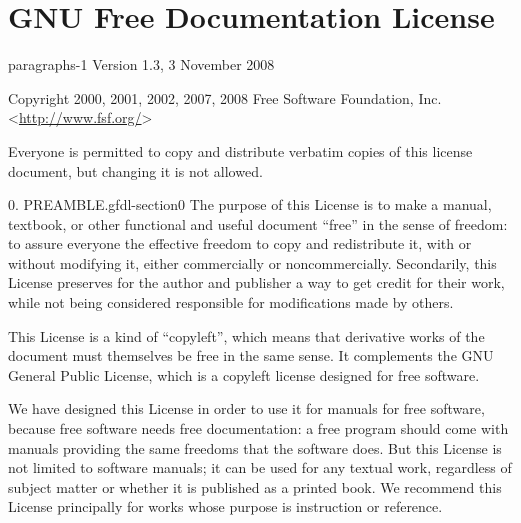 \documentclass[10pt,]{book}
\numberwithin{equation}{section}
\begin{document}
\chapter[{GNU Free Documentation License}]{GNU Free Documentation License}\label{appendix-gfdl}
\begin{paragraphs}{}{paragraphs-1}%
\hypertarget{p-1523}{}%
Version 1.3, 3 November 2008%
\par
\hypertarget{p-1524}{}%
Copyright \textcopyright{} 2000, 2001, 2002, 2007, 2008 Free Software Foundation, Inc. \textless{}\url{http://www.fsf.org/}\textgreater{}%
\par
\hypertarget{p-1525}{}%
Everyone is permitted to copy and distribute verbatim copies of this license document, but changing it is not allowed.%
\end{paragraphs}%
\begin{paragraphs}{0. PREAMBLE.}{gfdl-section0}%
\hypertarget{p-1526}{}%
The purpose of this License is to make a manual, textbook, or other functional and useful document ``free'' in the sense of freedom: to assure everyone the effective freedom to copy and redistribute it, with or without modifying it, either commercially or noncommercially. Secondarily, this License preserves for the author and publisher a way to get credit for their work, while not being considered responsible for modifications made by others.%
\par
\hypertarget{p-1527}{}%
This License is a kind of ``copyleft'', which means that derivative works of the document must themselves be free in the same sense. It complements the GNU General Public License, which is a copyleft license designed for free software.%
\par
\hypertarget{p-1528}{}%
We have designed this License in order to use it for manuals for free software, because free software needs free documentation: a free program should come with manuals providing the same freedoms that the software does. But this License is not limited to software manuals; it can be used for any textual work, regardless of subject matter or whether it is published as a printed book. We recommend this License principally for works whose purpose is instruction or reference.%
\end{paragraphs}%
\end{document}
